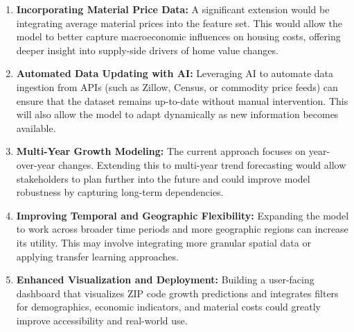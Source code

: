 \begin{enumerate}
    \item \textbf{Incorporating Material Price Data:} A significant extension would be integrating average material prices into the feature set. This would allow the model to better capture macroeconomic influences on housing costs, offering deeper insight into supply-side drivers of home value changes.

    \item \textbf{Automated Data Updating with AI:} Leveraging AI to automate data ingestion from APIs (such as Zillow, Census, or commodity price feeds) can ensure that the dataset remains up-to-date without manual intervention. This will also allow the model to adapt dynamically as new information becomes available.

    \item \textbf{Multi-Year Growth Modeling:} The current approach focuses on year-over-year changes. Extending this to multi-year trend forecasting would allow stakeholders to plan further into the future and could improve model robustness by capturing long-term dependencies.

    \item \textbf{Improving Temporal and Geographic Flexibility:} Expanding the model to work across broader time periods and more geographic regions can increase its utility. This may involve integrating more granular spatial data or applying transfer learning approaches.

    \item \textbf{Enhanced Visualization and Deployment:} Building a user-facing dashboard that visualizes ZIP code growth predictions and integrates filters for demographics, economic indicators, and material costs could greatly improve accessibility and real-world use.
\end{enumerate}
